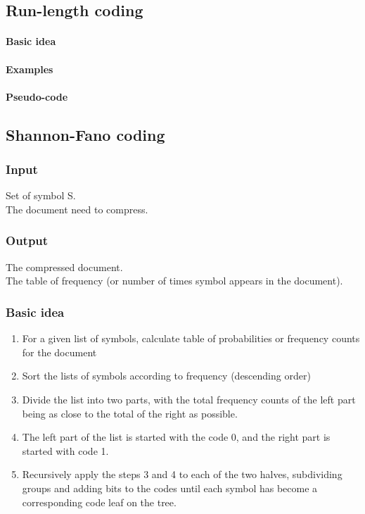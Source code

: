 \subsection{Run-length coding}
\paragraph*{Basic idea}
\paragraph*{Examples}
\paragraph*{Pseudo-code}

\subsection{Shannon-Fano coding}
\subsubsection*{Input}
Set of symbol S.\\
The document need to compress.
\subsubsection*{Output}
The compressed document.\\
The table of frequency (or number of times symbol appears in the document).
\subsubsection*{Basic idea}
\begin{enumerate}
\item For a given list of symbols, calculate table of probabilities or frequency counts for the document
\item Sort the lists of symbols according to frequency (descending order)
\item Divide the list into two parts, with the total frequency counts of the left part being as close to the total of the right as possible.
\item The left part of the list is started with the code 0, and the right part is started with code 1. 
\item Recursively apply the steps 3 and 4 to each of the two halves, subdividing groups and adding bits to the codes until each symbol has become a corresponding code leaf on the tree.
\end{enumerate}

